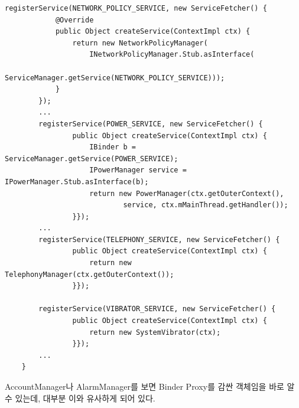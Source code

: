 \begin{lstlisting}[frame=single, caption=ContextImpl.java]
        registerService(NETWORK_POLICY_SERVICE, new ServiceFetcher() {
            @Override
            public Object createService(ContextImpl ctx) {
                return new NetworkPolicyManager(
                	INetworkPolicyManager.Stub.asInterface(
                    ServiceManager.getService(NETWORK_POLICY_SERVICE)));
            }
        });
		...
        registerService(POWER_SERVICE, new ServiceFetcher() {
                public Object createService(ContextImpl ctx) {
                    IBinder b = ServiceManager.getService(POWER_SERVICE);
                    IPowerManager service = IPowerManager.Stub.asInterface(b);
                    return new PowerManager(ctx.getOuterContext(),
                            service, ctx.mMainThread.getHandler());
                }});
		...
        registerService(TELEPHONY_SERVICE, new ServiceFetcher() {
                public Object createService(ContextImpl ctx) {
                    return new TelephonyManager(ctx.getOuterContext());
                }});

        registerService(VIBRATOR_SERVICE, new ServiceFetcher() {
                public Object createService(ContextImpl ctx) {
                    return new SystemVibrator(ctx);
                }});
		...
    }
\end{lstlisting}
AccountManager나 AlarmManager를 보면 Binder Proxy를 감싼 객체임을 바로 알 수 있는데, 대부분 이와 유사하게 되어 있다.\\


